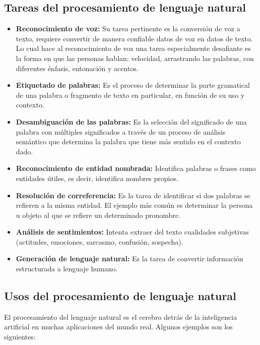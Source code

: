 \documentclass[12pt, a4paper, titlepage]{report}
\begin{document}
		        \subsection{Tareas del procesamiento de lenguaje natural}
		        \begin{itemize}
		        	\item \textbf{Reconocimiento de voz: }Su tarea pertinente es la conversión de voz a texto, requiere convertir de manera confiable datos de voz en datos de texto. Lo cual hace al reconocimiento de voz una tarea especialmente desafiante es la forma en que las personas hablan: velocidad, arrastrando las palabras, con diferentes énfasis, entonación y acentos.
		        	\item \textbf{Etiquetado de palabras: }Es el proceso de determinar la parte gramatical de una palabra o fragmento de texto en particular, en función de su uso y contexto.
		        	\item \textbf{Desambiguación de las palabras: }Es la selección del significado de una palabra con múltiples significados a través de un proceso de análisis semántico que determina la palabra que tiene más sentido en el contexto dado. 
		        	\item \textbf{Reconocimiento de entidad nombrada: }Identifica palabras o frases como entidades útiles, es decir, identifica nombres propios.
		        	\item \textbf{Resolución de correferencia: }Es la tarea de identificar si dos palabras se refieren a la misma entidad. El ejemplo más común es determinar la persona u objeto al que se refiere un determinado pronombre.
		        	\item \textbf{Análisis de sentimientos: }Intenta extraer del texto cualidades subjetivas (actitudes, emociones, sarcasmo, confusión, sospecha).
		        	\item \textbf{Generación de lenguaje natural: }Es la tarea de convertir información estructurada a lenguaje humano.
		        \end{itemize} 
		    
		    	\subsection{Usos del procesamiento de lenguaje natural}
		    	
		    	El procesamiento del lenguaje natural es el cerebro detrás de la inteligencia artificial en muchas aplicaciones del mundo real. Algunos ejemplos son los siguientes:
		    	
\end{document}
